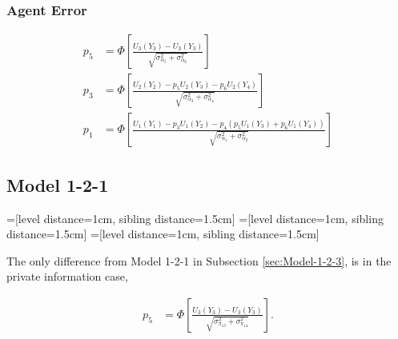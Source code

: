 \documentclass{article}
\begin{document}
\subsubsection{Agent Error}
\begin{align*}
  p_{5} &= \Phi
  \left[
    \frac{U_{3}(Y_{3}) - U_{3}(Y_{3})}
    {\sqrt{\sigma^{2}_{\alpha_{5}} + \sigma^{2}_{\alpha_{6}}}} 
  \right] \\
  p_{3} &= \Phi
  \left[
    \frac{U_{2}(Y_{2}) - p_{5} U_{2}(Y_{3}) - p_{6} U_{2}(Y_{4})}
    {\sqrt{\sigma^{2}_{\alpha_{3}} + \sigma^{2}_{\alpha_{4}}}} 
  \right] \\
  p_{1} &= \Phi
  \left[
    \frac{U_{1}(Y_{1}) - p_{3} U_{1}(Y_{2}) - p_{4} \left( p_{5} U_{1}(Y_{3}) + p_{6} U_{1}(Y_{4}) \right)}
    {\sqrt{\sigma^{2}_{\alpha_{1}} + \sigma^{2}_{\alpha_{2}}}} 
  \right] 
\end{align*}

\subsection{Model 1-2-1}
\label{Model-1-2-1}

=[level distance=1cm, sibling distance=1.5cm]
=[level distance=1cm, sibling distance=1.5cm]
=[level distance=1cm, sibling distance=1.5cm]




The only difference from Model 1-2-1 in Subsection \ref{sec:Model-1-2-3}, 
is in the private information case, 

\begin{align*}
  p_{5} &= \Phi
  \left[
    \frac{U_{3}(Y_{3}) - U_{3}(Y_{3})}{\sqrt{\sigma^{2}_{\pi_{13}} + \sigma^{2}_{\pi_{14}}}} 
  \right]. 
\end{align*}
\end{document}

